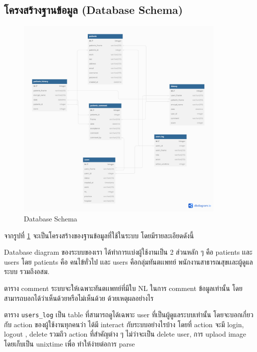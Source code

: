 \subsection{โครงสร้างฐานข้อมูล (Database Schema)}
\begin{figure}[h]
    \begin{center}
        \includegraphics[width=0.9\textwidth]{img/database.png}
    \end{center}
    \caption[Poem]{Database Schema}
    \label{fig:data_schema}
\end{figure}
จากรูปที่ \ref{fig:data_schema} จะเป็นโครงสร้างของฐานข้อมูลที่ใช้ในระบบ โดยมีรายละเอียดดังนี้



Database diagram ของระบบของเรา ได้ทำการเเบ่งผู้ใช้งานเป็น 2 ส่วนหลัก ๆ คือ patients เเละ users โดย patients คือ คนไข้ทั่วไป เเละ users คือกลุ่มทันตเเพทย์ พนักงานสาธารณสุขเเละผู้ดูแลระบบ รวมถึงอสม.

ตาราง comment ระบบจะให้เฉพาะทันตเเพทย์ที่มีใบ NL ในการ comment ข้อมูลเท่านั้น โดยสามารถบอกได้ว่าเห็นด้วยหรือไม่เห็นด้วย ด้วยเหตุผลอย่างไร

ตาราง \texttt{users\_log} เป็น table ที่สามารถดูได้เฉพาะ user ที่เป็นผู้ดูแลระบบเท่านั้น
โดยจะบอกเกี่ยวกับ action ของผู้ใช้งานทุกคนว่า ได้มี interact กับระบบอย่างไรบ้าง โดยที่ action จะมี login, logout , delete รวมถึว action ที่สำคัญต่าง ๆ ไม่ว่าจะเป็น delete user, การ uplaod image โดยเก็บเป็น unixtime เพื่อ ทำให้ง่ายต่อการ parse

